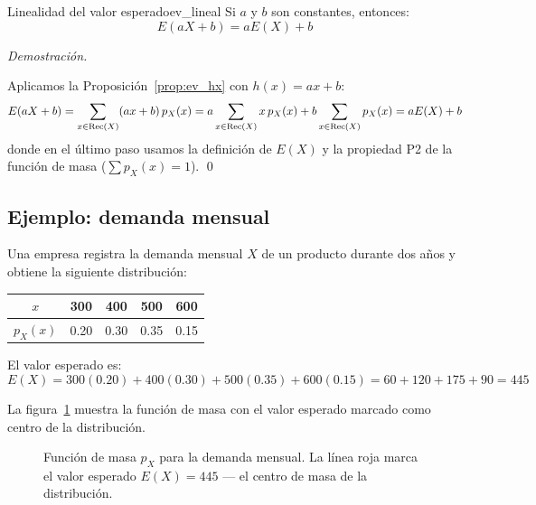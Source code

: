 \documentclass[12pt, a4paper]{book}
\renewenvironment{proof}{%
    \par\medskip\noindent\textit{Demostraci\'{o}n.}\enspace
}{\qed\par\medskip}
\numberwithin{equation}{chapter}
\begin{document}
\begin{proposicion}{Linealidad del valor esperado}{ev_lineal}
	Si $a$ y $b$ son constantes, entonces:
	\[
	E(aX + b) = aE(X) + b
	\]
\end{proposicion}

\begin{proof}
	Aplicamos la Proposición~\ref{prop:ev_hx} con $h(x) = ax + b$:
	\[
	E(aX + b) 
	= \sum_{x \in \text{Rec}(X)} (ax + b)\, p_X(x)
	= a \sum_{x \in \text{Rec}(X)} x\, p_X(x) 
	+ b \sum_{x \in \text{Rec}(X)} p_X(x)
	= aE(X) + b \qedhere
	\]
	donde en el último paso usamos la definición de $E(X)$ y la 
	propiedad P2 de la función de masa 
	($\sum p_X(x) = 1$).
\end{proof}

\subsection*{Ejemplo: demanda mensual}

Una empresa registra la demanda mensual $X$ de un producto durante 
dos años y obtiene la siguiente distribución:

\medskip
\begin{center}
	\begin{tabular}{@{}ccccc@{}}
		\toprule
		$x$ & 300 & 400 & 500 & 600 \\
		\midrule
		$p_X(x)$ & 0.20 & 0.30 & 0.35 & 0.15 \\
		\bottomrule
	\end{tabular}
\end{center}
\medskip

El valor esperado es:
\[
E(X) = 300(0.20) + 400(0.30) + 500(0.35) + 600(0.15)
= 60 + 120 + 175 + 90 = 445
\]

La figura~\ref{fig:ev} muestra la función de masa con el valor 
esperado marcado como centro de la distribución.

\begin{figure}[H]
	\centering
	\caption{Función de masa $p_X$ para la demanda mensual. La línea 
		roja marca el valor esperado $E(X) = 445$ — el centro de masa de 
		la distribución.}
	\label{fig:ev}
\end{figure}
\end{document}
